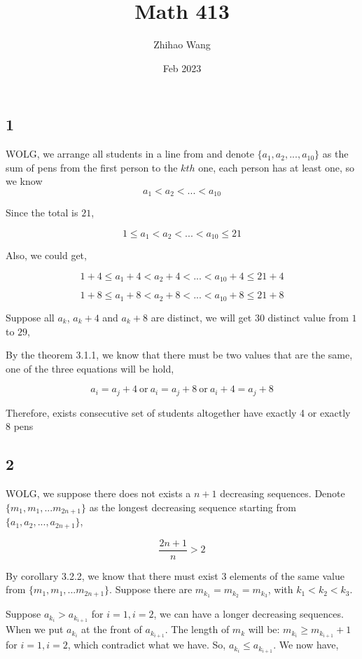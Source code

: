 \documentclass{article}
\title{Math 413}
\author{Zhihao Wang}
\date{Feb 2023}
\begin{document}
\maketitle

\subsection*{1}

WOLG, we arrange all students in a line from and denote $\{a_1, a_2, ..., a_{10} \}$ as the sum of pens from the first person to the $kth$ one, each person has at least one, so we know
    $$a_1 < a_2 < ... < a_{10}$$

Since the total is $21$,

 $$ 1 \le a_1 < a_2 < ... < a_{10} \le 21$$

Also, we could get,

 $$ 1 + 4 \le a_1 + 4 < a_2 + 4 < ... < a_{10} + 4 \le 21 + 4$$
 
 $$ 1 + 8 \le a_1 + 8 < a_2 + 8 < ... < a_{10} + 8 \le 21 + 8$$

Suppose all $a_k$, $a_k + 4$  and $a_k + 8$ are distinct, we will get 30 distinct value from $1$ to $29$,

By the theorem 3.1.1, we know that there must be two values that are the same, one of the three equations will be hold,

$$a_i = a_j + 4 \  \text{or} \ a_i = a_j + 8 \ \text{or} \ a_i + 4 = a_j + 8$$

Therefore, exists consecutive set of students altogether have exactly 4 or exactly 8 pens


\subsection*{2}

WOLG, we suppose there does not exists a $n + 1$ decreasing sequences. Denote $\{m_1, m_1, ... m_{2n+1}\}$ as the longest decreasing sequence starting from $\{a_1, a_2, ..., a_{2n+1} \}$, 

    $$\frac{2n + 1}{n} > 2$$

By corollary 3.2.2, we know that there must exist $3$ elements of the same value from $\{m_1, m_1, ... m_{2n+1}\}$. Suppose there are $m_{k_1} = m_{k_2} = m_{k_3}$, with  $k_1 < k_2 < k_3$.

Suppose $a_{k_i} > a_{k_{i+1}}$ for $i = 1, i = 2$, we can have a longer decreasing sequences. When we put $a_{k_i}$ at the front of ${a_{k_{i+1}}}$. The length of $m_k$ will be: $m_{k_i} \ge m_{k_{i+1}} + 1$ for $i = 1, i = 2$, which contradict what we have. So,  $a_{k_i} \le a_{k_{i+1}}$. We now have,
\end{document}
